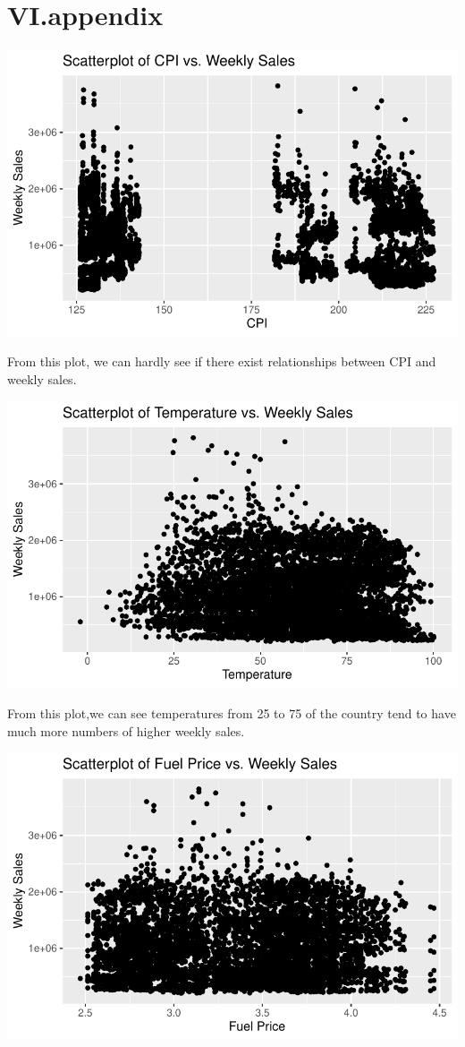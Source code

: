\documentclass[
  letterpaper,
  DIV=11,
  numbers=noendperiod]{scrartcl}
\begin{document}
\hypertarget{vi.appendix}{%
\section{VI.appendix}\label{vi.appendix}}

\includegraphics{678final_files/figure-pdf/unnamed-chunk-18-1.pdf}

From this plot, we can hardly see if there exist relationships between
CPI and weekly sales.

\includegraphics{678final_files/figure-pdf/unnamed-chunk-19-1.pdf}

From this plot,we can see temperatures from 25 to 75 of the country tend
to have much more numbers of higher weekly sales.

\includegraphics{678final_files/figure-pdf/unnamed-chunk-20-1.pdf}
\end{document}
